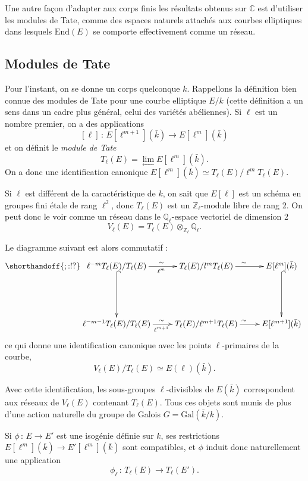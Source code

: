 \documentclass[11pt,a4paper]{article}
\newcommand{\Z}{\mathbb{Z}}
\newcommand{\C}{\mathbb{C}}
\newcommand{\Q}{\mathbb{Q}}
\newcommand{\vers}{\longrightarrow}
\newcommand{\End}{\mathrm{End}}
\newcommand{\de}{\,:\,}
\theoremstyle{definition}
\begin{document}
Une autre façon d'adapter aux corps finis les résultats obtenus sur $\C$ est d'utiliser les modules de Tate, comme des espaces naturels attachés aux courbes elliptiques dans lesquels $\End(E)$ se comporte effectivement comme un réseau.

\subsection{Modules de Tate}


Pour l'instant, on se donne un corps quelconque $k$. Rappellons la définition bien connue des modules de Tate pour une courbe elliptique $E/k$ (cette définition a un sens dans un cadre plus général, celui des variétés abéliennes). Si $\ell$ est un nombre premier, on a des applications
$$ [\ell] \de E[\ell^{m+1}](\bar{k})\vers E[\ell^{m}](\bar{k})$$
et on définit le \emph{module de Tate}
$$T_\ell(E) = \lim_{\leftarrow} E[\ell^m](\bar{k}).$$
On a donc une identification canonique $E[\ell^m](\bar{k})\simeq T_\ell(E)/ \ell^{m} T_\ell(E)$.

Si $\ell$ est différent de la caractéristique de $k$, on sait que $E[\ell]$ est un schéma en groupes fini étale de rang $\ell^2$, donc $T_\ell(E)$ est un $\Z_\ell$-module libre de rang 2. On peut donc le voir comme un réseau dans le $\Q_\ell$-espace vectoriel de dimension 2
$$V_\ell(E) = T_\ell(E) \otimes_{\Z_\ell} \Q_\ell.$$

Le diagramme suivant est alors commutatif :
$$
\shorthandoff{;:!?}
\xymatrix {
\ell^{-m} T_\ell(E)/ T_\ell(E) \ar[r]_{\ell^m}^{\sim} \ar@{^{(}->}[dd]&
 T_\ell(E)/ l^m T_\ell(E) \ar[r]^{\sim}  & 
 E[\ell^m](\bar{k}) \ar@{^{(}->}[dd] \\ 
 \\
 \ell^{-m-1} T_\ell(E)/ T_\ell(E) \ar[r]_{\ell^{m+1}}^{\sim} &
 T_\ell(E)/ \ell^{m+1} T_\ell(E) \ar[r]^{\sim}  & 
 E[\ell^{m+1}](\bar{k})
}
$$
ce qui donne une identification canonique avec les points $\ell$-primaires de la courbe,
$$ V_\ell(E)/ T_\ell(E) \simeq E(\ell)(\bar{k}).$$

Avec cette identification, les sous-groupes $\ell$-divisibles de $E(\bar{k})$ correspondent aux réseaux de $V_\ell(E)$ contenant $T_\ell(E)$. Tous ces objets sont munis de plus d'une action naturelle du groupe de Galois $G= \mathrm{Gal}(\bar{k}/k)$.

Si $\phi\de E\vers E'$ est une isogénie définie sur $k$, ses restrictions $E[\ell^m](\bar{k})\vers E'[\ell^m](\bar{k})$ sont compatibles, et $\phi$ induit donc naturellement une application
$$ \phi_\ell\de T_\ell(E)\vers T_\ell(E').$$
\end{document}

